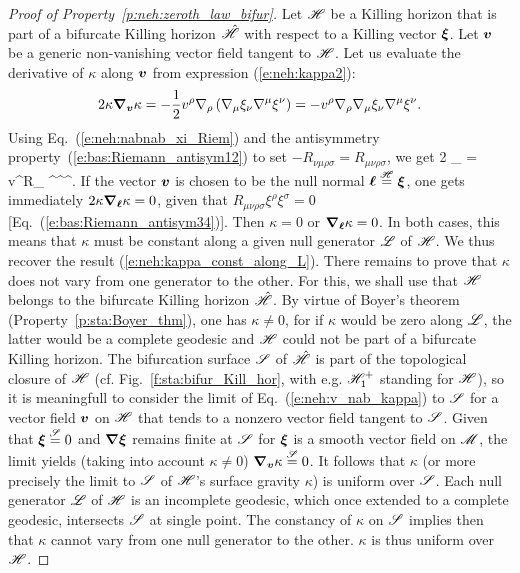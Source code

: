 \begin{proof}[Proof of Property~\ref{p:neh:zeroth_law_bifur}]
Let $\mathscr{H}$ be a Killing horizon that is part of a bifurcate Killing horizon
$\hat{\mathscr{H}}$ with respect to a Killing vector $\bm{\xi}$.
Let $\bm{v}$ be a generic non-vanishing vector field tangent to $\mathscr{H}$. Let us
evaluate the derivative of $\kappa$ along $\bm{v}$ from expression (\ref{e:neh:kappa2}):
\[ 2 \kappa \bm{\nabla}_{\bm{v}} \kappa =
    - \frac{1}{2} v^\rho \nabla_\rho \left( \nabla_\mu \xi_\nu \nabla^\mu \xi^\nu \right) =
    - v^\rho \nabla_\rho \nabla_\mu \xi_\nu \nabla^\mu \xi^\nu .\]
Using Eq.~(\ref{e:neh:nabnab_xi_Riem}) and the antisymmetry property~(\ref{e:bas:Riemann_antisym12}) to
set $-R_{\nu\mu\rho\sigma} = R_{\mu\nu\rho\sigma}$, we get
\be \label{e:neh:v_nab_kappa}
    2 \kappa \wnab_{}  \kappa = v^\rho R_{\mu\nu\rho\sigma} \xi^\sigma \nabla^\mu \xi^\nu .
\ee
If the vector $\bm{v}$ is chosen to be the null normal $\bm{\ell} \stackrel{\mathscr{H}}{=} \bm{\xi}$, one gets immediately
$2\kappa \bm{\nabla}_{\bm{\ell}}  \kappa = 0$, given that $R_{\mu\nu\rho\sigma} \xi^\rho \xi^\sigma = 0$
[Eq.~(\ref{e:bas:Riemann_antisym34})]. Then $\kappa = 0$ or $\bm{\nabla}_{\bm{\ell}}\kappa = 0$. In both
cases, this means that $\kappa$ must be constant along a given null generator $\mathscr{L}$ of $\mathscr{H}$.
We thus recover the result (\ref{e:neh:kappa_const_along_L}).
There remains to prove that $\kappa$ does not vary from one generator to the other.
For this, we shall use that $\mathscr{H}$ belongs to the bifurcate Killing horizon $\hat{\mathscr{H}}$.
By virtue of Boyer's theorem (Property~\ref{p:sta:Boyer_thm}), one has $\kappa\neq 0$, for if $\kappa$
would be zero along $\mathscr{L}$, the latter would be a complete geodesic and $\mathscr{H}$ could not be part of a
bifurcate Killing horizon. The bifurcation
surface $\mathscr{S}$ of $\hat{\mathscr{H}}$ is part of the topological closure of $\mathscr{H}$
(cf. Fig.~\ref{f:sta:bifur_Kill_hor}, with e.g. $\mathscr{H}_1^+$ standing for $\mathscr{H}$), so it is meaningfull to consider
the limit of Eq.~(\ref{e:neh:v_nab_kappa}) to $\mathscr{S}$ for a vector field $\bm{v}$ on $\mathscr{H}$ that tends to a nonzero
vector field tangent to $\mathscr{S}$. Given that
$\bm{\xi}\stackrel{\mathscr{S}}{=} 0$ and $\bm{\nabla}\bm{\xi}$ remains finite at $\mathscr{S}$ for
$\bm{\xi}$ is a smooth vector field on $\mathscr{M}$, the limit yields (taking into account $\kappa\neq 0$)
$\bm{\nabla}_{\bm{v}}  \kappa \stackrel{\mathscr{S}}{=} 0$.
It follows that $\kappa$ (or more precisely the limit to $\mathscr{S}$ of $\mathscr{H}$'s surface gravity $\kappa$) is uniform
over $\mathscr{S}$. Each null generator $\mathscr{L}$ of $\mathscr{H}$ is an incomplete geodesic, which once extended to a complete geodesic, intersects $\mathscr{S}$ at single point. The constancy of $\kappa$ on $\mathscr{S}$ implies then that $\kappa$ cannot vary from one
null generator to the other. $\kappa$ is thus uniform over $\mathscr{H}$.
\end{proof}

